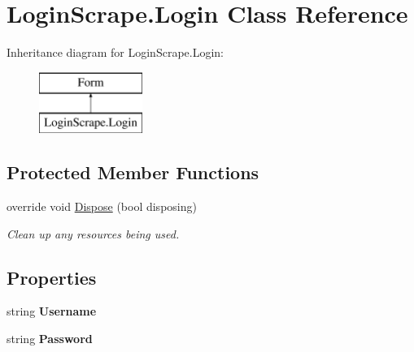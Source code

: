 \hypertarget{class_login_scrape_1_1_login}{}\section{Login\+Scrape.\+Login Class Reference}
\label{class_login_scrape_1_1_login}
Inheritance diagram for Login\+Scrape.\+Login\+:\begin{figure}[H]
\begin{center}
\leavevmode
\includegraphics[height=2.000000cm]{class_login_scrape_1_1_login}
\end{center}
\end{figure}
\subsection*{Protected Member Functions}
\begin{DoxyCompactItemize}
\item 
override void \hyperlink{class_login_scrape_1_1_login_a75ef91c856cb125b0b0af2b9af9fb470}{Dispose} (bool disposing)
\begin{DoxyCompactList}\small\item\em Clean up any resources being used. \end{DoxyCompactList}\end{DoxyCompactItemize}
\subsection*{Properties}
\begin{DoxyCompactItemize}
\item 
\hypertarget{class_login_scrape_1_1_login_afb5df674c55555c1d566614f0471a111}{}string {\bfseries Username}\label{class_login_scrape_1_1_login_afb5df674c55555c1d566614f0471a111}

\item 
\hypertarget{class_login_scrape_1_1_login_a514c2ba5f09dd7b7c123d3c6639621f8}{}string {\bfseries Password}\label{class_login_scrape_1_1_login_a514c2ba5f09dd7b7c123d3c6639621f8}

\end{DoxyCompactItemize}


